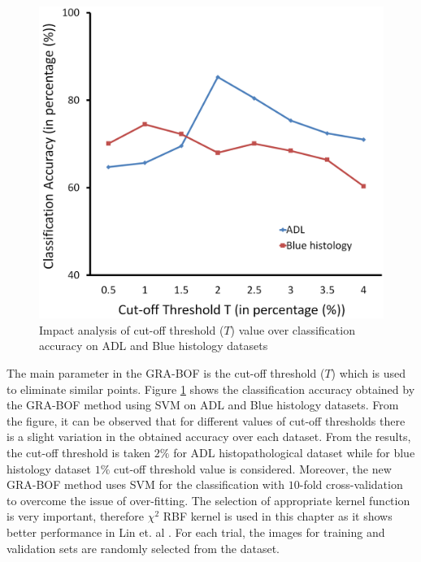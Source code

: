 \begin{figure}[ht!]
\centering
\includegraphics[scale=0.2]{emp}
\caption[Impact analysis of cut-off threshold value over classification accuracy on ADL and Blue histology datasets]{\fontsize{10pt}{12pt}\selectfont Impact analysis of cut-off threshold ($T$) value over classification accuracy on ADL and Blue histology datasets}
\label{ch5:fig:T3}
\end{figure}
 The main parameter in the GRA-BOF is the cut-off threshold ($T$) which is used to eliminate similar points. Figure \ref{ch5:fig:T3} shows the classification accuracy obtained by the GRA-BOF method using SVM on ADL and Blue histology datasets. From the figure, it can be observed that for different values of cut-off thresholds there is a slight variation in the obtained accuracy over each dataset. From the results, the cut-off threshold is taken $2\%$ for  ADL histopathological dataset while for blue histology dataset $1\%$ cut-off threshold value is considered. Moreover, the new GRA-BOF method uses SVM for the classification with $10$-fold cross-validation to overcome the issue of over-fitting. The selection of appropriate kernel function is very important, therefore $\chi^2$ RBF kernel is used in this chapter as it shows better performance in Lin et. al \cite{lin2016}. For each trial, the images for training and validation sets are randomly selected from the dataset. 
 
